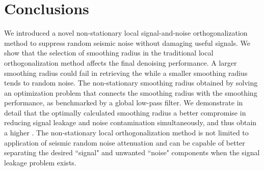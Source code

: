\section{Conclusions}
We introduced a novel non-stationary local signal-and-noise orthogonalization method to suppress random seismic noise without damaging useful signals. We show that the selection of smoothing radius in the traditional local orthogonalization method  affects the final denoising performance. A larger smoothing radius could fail in retrieving the  while a smaller smoothing radius tends to  random noise. The non-stationary smoothing radius  obtained by solving an optimization problem that connects the smoothing radius with the smoothing performance, as benchmarked by a global low-pass filter. We demonstrate in detail that the optimally calculated smoothing radius  a better compromise in reducing signal leakage and noise contamination simultaneously, and thus  obtain a higher . The non-stationary local orthogonalization method is not limited to application of seismic random noise attenuation and can be capable of better separating the desired ``signal" and unwanted ``noise" components when the signal leakage problem exists. 



